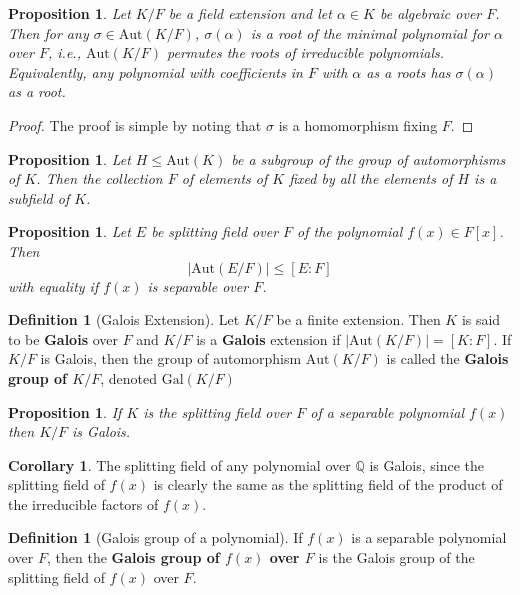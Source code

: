\documentclass[10pt, oneside, reqno]{amsart}
\theoremstyle{plain}%
\newtheorem{prop}[thm]{Proposition}
\theoremstyle{definition}
\newtheorem{defn}[thm]{Definition}
\newtheorem{cor}[thm]{Corollary}
\theoremstyle{remark}
\newcommand{\al}{\alpha}
\newcommand{\Q}{\mathbb{Q}}
\newcommand{\aut}[1]{\text{Aut}{(#1)}}
\newcommand{\xdeg}[2]{[#1 : #2]}
\newcommand{\gal}[2]{\text{Gal}(#1/#2)}
\begin{document}
\begin{prop}
	Let $K/F$ be a field extension and let $\al \in K$ be algebraic over $F$.  Then for any $\sigma \in \aut{K/F}$,  $\sigma (\al)$ is a root of the minimal polynomial for $\al$ over $F$, i.e., $\aut{K/F}$ permutes the roots of irreducible polynomials.  Equivalently, any polynomial with coefficients in $F$ with $\al$ as a roots has $\sigma(\alpha)$ as a root.
\end{prop}
\begin{proof}
	The proof is simple by noting that $\sigma$ is a homomorphism fixing $F$.
\end{proof}

\begin{prop}
	Let $H \leq \text{Aut}(K)$ be a subgroup of the group of automorphisms of $K$.  Then the collection $F$ of elements of $K$ fixed by all the elements of $H$ is a subfield of $K$.
\end{prop}

\begin{prop}
	Let $E$ be splitting field over $F$ of the polynomial $f(x) \in F[x]$.  Then \[
		|\aut{E/F}| \leq \xdeg{E}{F}
	\] with equality if $f(x)$ is separable over $F$.
\end{prop}

\begin{defn}[Galois Extension]
	Let $K/F$ be a finite extension.  Then $K$ is said to be \textbf{Galois} over $F$ and $K/F$ is a \textbf{Galois} extension if $|\aut{K/F}| = \xdeg{K}{F}$.  If $K/F$ is Galois, then the group of automorphism $\aut{K/F}$ is called the \textbf{Galois group of $K/F$}, denoted $\gal{K}{F}$
\end{defn}

\begin{prop}
	If $K$ is the splitting field over $F$ of a separable polynomial $f(x)$ then $K/F$ is Galois.
\end{prop}

\begin{cor}
	The splitting field of any polynomial over $\Q$ is Galois, since the splitting field of $f(x)$ is clearly the same as the splitting field of the product of the irreducible factors of $f(x)$.
\end{cor}

\begin{defn}[Galois group of a polynomial]
	If $f(x)$ is a separable polynomial over $F$, then the \textbf{Galois group of $f(x)$ over $F$} is the Galois group of the splitting field of $f(x)$ over $F$.
\end{defn}
\end{document}
